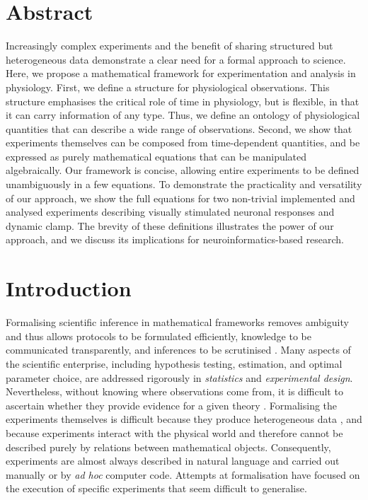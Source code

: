 
\section*{Abstract}

Increasingly complex experiments and the benefit of sharing structured
but heterogeneous data demonstrate a clear need for a formal approach
to science.  Here, we propose a mathematical framework for
experimentation and analysis in physiology. First, we define a
structure for physiological observations. This structure emphasises
the critical role of time in physiology, but is flexible, in that it
can carry information of any type. Thus, we define an ontology of
physiological quantities that can describe a wide range of
observations. Second, we show that experiments themselves can be
composed from time-dependent quantities, and be expressed as
purely mathematical equations that can be manipulated
algebraically. Our framework is concise, allowing entire experiments
to be defined unambiguously in a few equations. To demonstrate the
practicality and versatility of our approach, we show the full
equations for two non-trivial implemented and analysed experiments
describing visually stimulated neuronal responses and dynamic
clamp. The brevity of these definitions illustrates the power of our
approach, and we discuss its implications for neuroinformatics-based 
research.

\pagebreak

\section*{Introduction}

Formalising scientific inference in mathematical frameworks removes
ambiguity and thus allows protocols to be formulated efficiently,
knowledge to be communicated transparently, and inferences to be
scrutinised \citep{Soldatova2006, Jaynes2003, Krantz1971}. Many
aspects of the scientific enterprise, including hypothesis testing,
estimation, and optimal parameter choice, are addressed rigorously in
\emph{statistics} and \emph{experimental design}. Nevertheless,
without knowing where observations come from, it is difficult to
ascertain whether they provide evidence for a given theory
\citep{Pool2002,MacKenzie-Graham2008,VanHorn2009}. Formalising the
experiments themselves is difficult because they produce heterogeneous
data \citep{Tukey1962}, and because experiments interact with the
physical world and therefore cannot be described purely by relations
between mathematical objects. Consequently, experiments are 
almost always described in natural language and carried out manually or by
\emph{ad hoc} computer code. Attempts at formalisation have focused on the
execution of specific experiments \citep{Jenkins1989, Manduchi1990, King2004}
that seem difficult to generalise.

